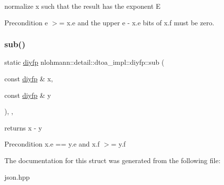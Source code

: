 normalize x such that the result has the exponent E 

\begin{DoxyPrecond}{Precondition}
e $>$= x.\+e and the upper e -\/ x.\+e bits of x.\+f must be zero. 
\end{DoxyPrecond}
\mbox{\label{structnlohmann_1_1detail_1_1dtoa__impl_1_1diyfp_aeb26771af54ad73598c1a0430d65d884}} 
\subsubsection{\texorpdfstring{sub()}{sub()}}
{\footnotesize\ttfamily static \mbox{\hyperlink{structnlohmann_1_1detail_1_1dtoa__impl_1_1diyfp}{diyfp}} nlohmann\+::detail\+::dtoa\+\_\+impl\+::diyfp\+::sub (\begin{DoxyParamCaption}\item[{const \mbox{\hyperlink{structnlohmann_1_1detail_1_1dtoa__impl_1_1diyfp}{diyfp}} \&}]{x,  }\item[{const \mbox{\hyperlink{structnlohmann_1_1detail_1_1dtoa__impl_1_1diyfp}{diyfp}} \&}]{y }\end{DoxyParamCaption})\hspace{0.3cm}{\ttfamily [inline]}, {\ttfamily [static]}, {\ttfamily [noexcept]}}



returns x -\/ y 

\begin{DoxyPrecond}{Precondition}
x.\+e == y.\+e and x.\+f $>$= y.\+f 
\end{DoxyPrecond}


The documentation for this struct was generated from the following file\+:\begin{DoxyCompactItemize}
\item 
json.\+hpp\end{DoxyCompactItemize}
